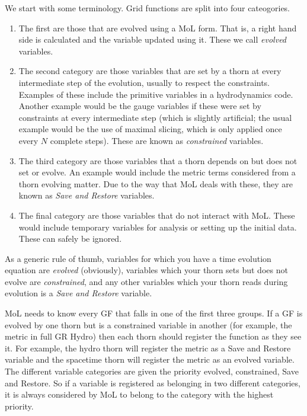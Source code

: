 We start with some terminology. Grid functions are split into four
cateogories.
\begin{enumerate}
\item The first are those that are evolved using a MoL form. That is,
  a right hand side is calculated and the variable updated using
  it. These we call {\it evolved} variables.
\item The second category are those variables that are set by a thorn
  at every intermediate step of the evolution, usually to respect the
  constraints. Examples of these include the primitive variables in a
  hydrodynamics code. Another example would be the gauge variables if
  these were set by constraints at every intermediate step (which is
  slightly artificial; the usual example would be the use of maximal
  slicing, which is only applied once every $N$ complete steps). These
  are known as {\it constrained} variables.
\item The third category are those variables that a thorn depends on
  but does not set or evolve. An example would include the metric
  terms considered from a thorn evolving matter. Due to the way that
  MoL deals with these, they are known as {\it Save and Restore}
  variables.
\item The final category are those variables that do not interact with
  MoL. These would include temporary variables for analysis or setting
  up the initial data. These can safely be ignored.
\end{enumerate}
As a generic rule of thumb, variables for which you have a time
evolution equation are {\it evolved} (obviously), variables which your
thorn sets but does not evolve are {\it constrained}, and any other
variables which your thorn reads during evolution is a {\it Save and
  Restore} variable.

MoL needs to know every GF that falls in one of the first three
groups. If a GF is evolved by one thorn but is a constrained variable
in another (for example, the metric in full GR Hydro) then each thorn
should register the function as they see it. For example, the hydro
thorn will register the metric as a Save and Restore variable and the
spacetime thorn will register the metric as an evolved variable. The
different variable categories are given the priority evolved,
constrained, Save and Restore. So if a variable is registered as
belonging in two different categories, it is always considered by MoL
to belong to the category with the highest priority.

